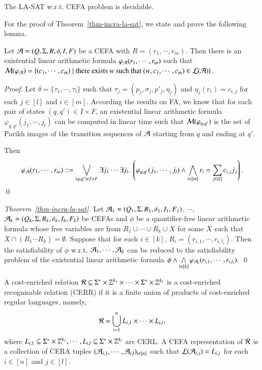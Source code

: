 \begin{theorem}\label{thm-incra-la-sat}
	The LA-SAT w.r.t. CEFA problem is decidable.
\end{theorem}

For the proof of Theorem~\ref{thm-incra-la-sat}, we state and prove the following lemma. 

\begin{lemma}\label{lem-incra-la}
	Let $\mathcal{A}=(Q, \Sigma, R, \delta, I, F)$ be a CEFA with $R= (r_1, \cdots,  r_m)$. Then there is an existential linear arithmetic formula $\varphi_{\mathcal{A}}(r_1, \cdots, r_m)$ such that $\mathcal{M}(\varphi_{\mathcal{A}})= \{(c_1, \cdots, c_m) \mid \mbox{there exists } w \mbox{ such that } (w, c_1, \cdots, c_m) \in \mathcal{L}(\mathcal{A})\}$.
\end{lemma}

\begin{proof}
	Let $\delta = \{\tau_1, \cdots, \tau_l\}$ such that $\tau_j = (p_j, \sigma_j, p'_j, \eta_j)$ and $\eta_j(r_i) =  c_{i,j}$ for each $j \in [l]$ and $i \in [m]$.
	According the results on FA, we know that for each pair of states $(q, q') \in I \times F$,  an existential linear arithmetic formula $\varphi_{q,q'}(j_1, \cdots, j_l)$ can be computed in linear time such that $\mathcal{M}(\varphi_{q,q'})$ is the set of Parikh images of the transition sequences of $\mathcal{A}$ starting from $q$ and ending at $q'$. 
	
	Then 
	\[\varphi_\Aut(r_1, \cdots, r_m) ::= \bigvee \limits_{(q,q') \in I \times F} \exists j_1 \cdots \exists j_l.\ \left(\varphi_{q,q'}(j_1, \cdots, j_l) \wedge \bigwedge \limits_{i \in [m]} r_i = \sum \limits_{j \in [l]} c_{i,j} j_j \right).\]
	\qed
\end{proof}

\begin{proof}[Theorem~\ref{thm-incra-la-sat}]
	Let $\mathcal{A}_1=(Q_1, \Sigma, R_1, \delta_1, I_1, F_1)$, $\cdots$, $\mathcal{A}_k=(Q_k, \Sigma, R_k, \delta_k, I_k, F_k)$ be CEFAs and $\phi$ be a quantifier-free linear arithmetic formula whose free variables are from  $R_1 \cup \cdots \cup R_k \cup X$ for some $X$ such that $X \cap (R_1 \cdots R_k) = \emptyset$.
	Suppose that for each $i \in [k]$, $R_i = (r_{i, 1}, \cdots, r_{i, l_i})$. Then the satisfiability of $\phi$ w.r.t. $\mathcal{A}_1,\cdots, \mathcal{A}_k$ can be reduced to the satisfiability problem of the  existential linear arithmetic formula
	$
	\phi \wedge \bigwedge \limits_{i \in [k]} \varphi_{\mathcal{A}_i}(r_{i,1}, \cdots, r_{i, l_i}).
	$
	\qed
\end{proof}

\begin{definition}
	A cost-enriched relation $\mathcal{R} \subseteq \Sigma^* \times \mathbb{Z}^{k_1} \times \cdots  \times \Sigma^* \times \mathbb{Z}^{k_l}$ is a cost-enriched recognisable relation (CERR)  if it is a finite union of products of cost-enriched regular languages, namely, 
	\[\mathcal{R} = \bigcup \limits_{i=1}^n L_{i,1 } \times \cdots \times L_{i, l},\]
	where $L_{i,1} \subseteq \Sigma^* \times \mathbb{Z}^{k_1}, \cdots, L_{i, l} \subseteq \Sigma^* \times \mathbb{Z}^{k_l}$ are CERL. 
	A CEFA representation of $\mathcal{R}$ is a collection of CERA tuples $(\mathcal{A}_{i,1}, \cdots, \mathcal{A}_{i,l})_{i \in [n]}$ such that $\mathcal{L}(\mathcal{A}_{i,j}) = L_{i,j}$ for each $i \in [n]$ and $j \in [l]$.
\end{definition}
